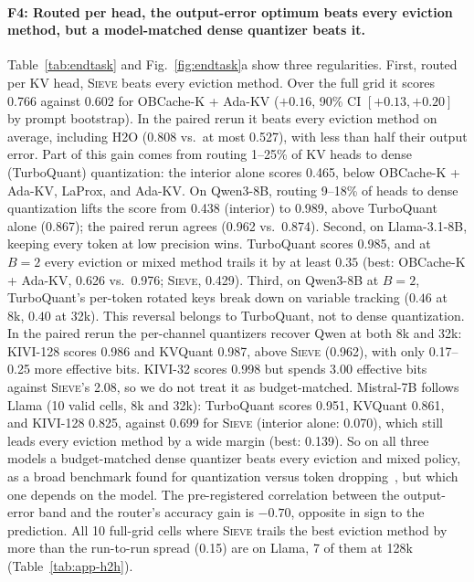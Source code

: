 \documentclass{article}
\newif\ifshowtbd \showtbdtrue
\newcommand{\tbd}[1]{\ifshowtbd{\color{tbdcol}\textbf{TBD}~#1}\else\ifhmode\unskip\fi\fi}
\newcommand{\sieve}{\textsc{Sieve}}
\theoremstyle{definition}
\begin{document}

\paragraph{F4: Routed per head, the output-error optimum beats every eviction method, but a model-matched dense quantizer beats it.}
Table~\ref{tab:endtask} and Fig.~\ref{fig:endtask}a show three regularities.  First, routed per KV head, \sieve{} beats every eviction method.  Over the full grid it scores 0.766 against 0.602 for OBCache-K + Ada-KV ($+0.16$, 90\% CI $[+0.13,+0.20]$ by prompt bootstrap).  In the paired rerun it beats every eviction method on average, including H2O (0.808 vs.\ at most 0.527), with less than half their output error.  Part of this gain comes from routing 1--25\% of KV heads to dense (TurboQuant) quantization: the interior alone scores 0.465, below OBCache-K + Ada-KV, LaProx, and Ada-KV.  On Qwen3-8B, routing 9--18\% of heads to dense quantization lifts the score from 0.438 (interior) to 0.989, above TurboQuant alone (0.867); the paired rerun agrees (0.962 vs.\ 0.874).  Second, on Llama-3.1-8B, keeping every token at low precision wins.  TurboQuant scores 0.985, and at $B=2$ every eviction or mixed method trails it by at least $0.35$ (best: OBCache-K + Ada-KV, 0.626 vs.\ 0.976; \sieve{}, 0.429).  Third, on Qwen3-8B at $B=2$, TurboQuant's per-token rotated keys break down on variable tracking ($0.46$ at 8k, $0.40$ at 32k).  This reversal belongs to TurboQuant, not to dense quantization.  In the paired rerun the per-channel quantizers recover Qwen at both 8k and 32k: KIVI-128 scores 0.986 and KVQuant 0.987, above \sieve{} (0.962), with only 0.17--0.25 more effective bits.  KIVI-32 scores 0.998 but spends 3.00 effective bits against \sieve{}'s 2.08, so we do not treat it as budget-matched.  Mistral-7B follows Llama (10 valid cells, 8k and 32k): TurboQuant scores 0.951, KVQuant 0.861, and KIVI-128 0.825, against 0.699 for \sieve{} (interior alone: 0.070), which still leads every eviction method by a wide margin (best: 0.139).  So on all three models a budget-matched dense quantizer beats every eviction and mixed policy, as a broad benchmark found for quantization versus token dropping~\citep{yuan2024kvbench}, but which one depends on the model.  The pre-registered correlation between the output-error band and the router's accuracy gain is $-0.70$, opposite in sign to the prediction.  All 10 full-grid cells where \sieve{} trails the best eviction method by more than the run-to-run spread (0.15) are on Llama, 7 of them at 128k (Table~\ref{tab:app-h2h}).
\end{document}
